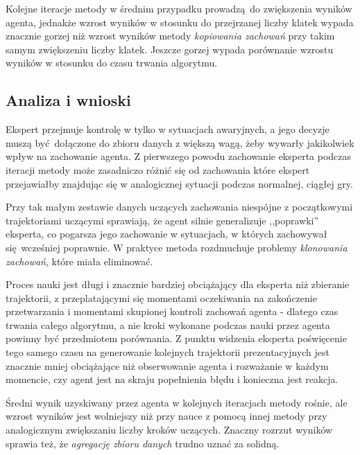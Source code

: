 Kolejne iteracje metody w średnim przypadku prowadzą do zwiększenia wyników agenta, jednakże wzrost wyników w stosunku do przejrzanej liczby klatek wypada znacznie gorzej niż wzrost wyników metody \textit{kopiowania zachowań} przy takim samym zwiększeniu liczby klatek. Jeszcze gorzej wypada porównanie wzrostu wyników w stosunku do czasu trwania algorytmu. 

\subsection {Analiza i wnioski}

Ekspert przejmuje kontrolę w tylko w sytuacjach awaryjnych, a jego decyzje muszą być dołączone do zbioru danych z większą wagą, żeby wywarły jakikolwiek wpływ na zachowanie agenta. Z pierwszego powodu zachowanie eksperta podczas iteracji metody może zasadniczo różnić się od zachowania które ekspert przejawiałby znajdując się w analogicznej sytuacji podczas normalnej, ciągłej gry.

Przy tak małym zestawie danych uczących zachowania niespójne z początkowymi trajektoriami uczącymi sprawiają, że agent silnie generalizuje ,,poprawki'' eksperta, co pogarsza jego zachowanie w sytuacjach, w których zachowywał się wcześniej poprawnie. W praktyce metoda rozdmuchuje problemy \textit{ klonowania zachowań}, które miała eliminować.

Proces nauki jest długi i znacznie bardziej obciążający dla eksperta niż zbieranie trajektorii, z przeplatającymi się momentami oczekiwania na zakończenie przetwarzania i momentami skupionej kontroli zachowań agenta - dlatego czas trwania całego algorytmu, a nie kroki wykonane podczas nauki przez agenta powinny być przedmiotem porównania. Z punktu widzenia eksperta poświęcenie tego samego czasu na generowanie kolejnych trajektorii prezentacyjnych jest znacznie mniej obciążające niż obserwowanie agenta i rozważanie w każdym momencie, czy agent jest na skraju popełnienia błędu i konieczna jest reakcja.

Średni wynik uzyskiwany przez agenta w kolejnych iteracjach metody rośnie, ale wzrost wyników jest wolniejszy niż przy nauce z pomocą innej metody przy analogicznym zwiększaniu liczby kroków uczących. Znaczny rozrzut wyników sprawia też, że \textit{agregację zbioru danych} trudno uznać za solidną.
